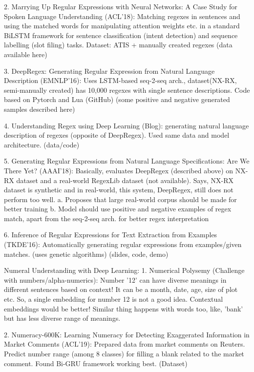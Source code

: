 2.      Marrying Up Regular Expressions with Neural Networks: A Case Study for Spoken Language Understanding (ACL'18): Matching regexes in sentences and using the matched words for manipulating attention weights etc. in a standard BiLSTM framework for sentence classification (intent detection) and sequence labelling (slot filing) tasks. Dataset: ATIS + manually created regexes (data available here)
 
3.      DeepRegex: Generating Regular Expression from Natural Language Description (EMNLP'16): Uses LSTM-based seq-2-seq arch., dataset(NX-RX, semi-manually created) has 10,000 regexes with single sentence descriptions. Code based on Pytorch and Lua (GitHub) (some positive and negative generated samples described here)
 
4.      Understanding Regex using Deep Learning (Blog): generating natural language description of regexes (opposite of DeepRegex). Used same data and model architecture. (data/code)
 
5.      Generating Regular Expressions from Natural Language Specifications: Are We There Yet? (AAAI'18): Basically, evaluates DeepRegex (described above) on NX-RX dataset and a real-world RegexLib dataset (not available). Says, NX-RX dataset is synthetic and in real-world, this system, DeepRegex, still does not perform too well.
a.      Proposes that large real-world corpus should be made for better training
b.      Model should use positive and negative examples of regex match, apart from the seq-2-seq arch. for better regex interpretation
 
6.      Inference of Regular Expressions for Text Extraction from Examples (TKDE'16): Automatically generating regular expressions from examples/given matches. (uses genetic algorithms) (slides, code, demo)
 
Numeral Understanding with Deep Learning:
1.      Numerical Polysemy (Challenge with numbers/alpha-numerics): Number '12' can have diverse meanings in different sentences based on context! It can be a month, date, age, size of plot etc. So, a single embedding for number 12 is not a good idea. Contextual embeddings would be better! Similar thing happens with words too, like, 'bank' but has less diverse range of meanings.
 
2.      Numeracy-600K: Learning Numeracy for Detecting Exaggerated Information in Market Comments (ACL'19): Prepared data from market comments on Reuters. Predict number range (among 8 classes) for filling a blank related to the market comment. Found Bi-GRU framework working best. (Dataset)
 
